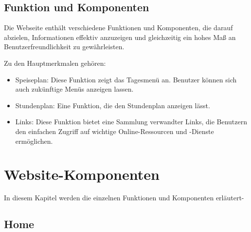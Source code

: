 \subsection{Funktion und Komponenten}
Die Webseite enthält verschiedene Funktionen und Komponenten, die darauf abzielen, Informationen effektiv anzuzeigen und gleichzeitig ein hohes Maß an Benutzerfreundlichkeit zu gewährleisten. 

Zu den Hauptmerkmalen gehören: 
\begin{itemize}
	\item Speiseplan: Diese Funktion zeigt das Tagesmenü an. Benutzer können sich auch zukünftige Menüs anzeigen lassen.
	\item Stundenplan: Eine Funktion, die den Stundenplan anzeigen lässt.
	\item Links: Diese Funktion bietet eine Sammlung verwandter Links, die Benutzern den einfachen Zugriff auf wichtige Online-Ressourcen und -Dienste ermöglichen.
\end{itemize}
\newpage
\section{Website-Komponenten}
In diesem Kapitel werden die einzelnen Funktionen und Komponenten erläutert-
\subsection{Home}
